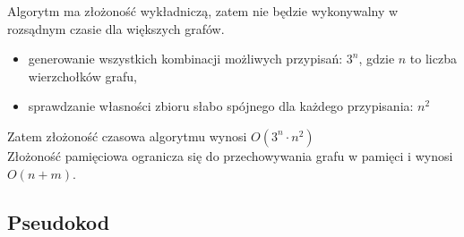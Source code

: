 Algorytm ma złożoność wykładniczą, zatem nie będzie wykonywalny w rozsądnym czasie dla większych grafów.
\begin{itemize}
    \item generowanie wszystkich kombinacji możliwych przypisań: $3^n$, gdzie $n$ to liczba wierzchołków grafu,
    \item sprawdzanie własności zbioru słabo spójnego dla każdego przypisania: $n^2$
\end{itemize}

Zatem złożoność czasowa algorytmu wynosi $O(3^n \cdot n^2)$\\
Złożoność pamięciowa ogranicza się do przechowywania grafu w pamięci i wynosi $O(n + m)$.

\subsection{Pseudokod}


